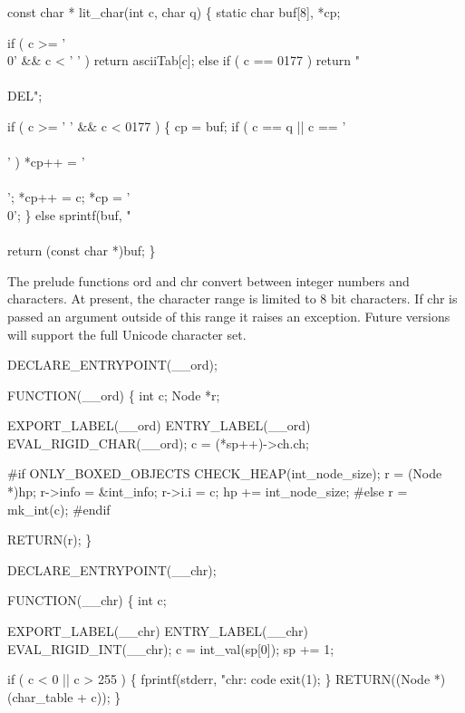 const char *
lit_char(int c, char q)
\{
    static char buf[8], *cp;
    
    if ( c >= '\\0' && c < ' ' )
        return asciiTab[c];
    else if ( c == 0177 )
        return "\\\\DEL";

    if ( c >= ' ' && c < 0177 )
    \{
        cp = buf;
        if ( c == q || c == '\\\\' )
            *cp++ = '\\\\';
        *cp++ = c;
        *cp   = '\\0';
    \}
    else
        sprintf(buf, "\\\\%

    return (const char *)buf;
\}

\nwendcode{}\nwdocspar
The prelude functions {\Tt{}ord\nwendquote} and {\Tt{}chr\nwendquote} convert between integer
numbers and characters. At present, the character range is limited to
8 bit characters. If {\Tt{}chr\nwendquote} is passed an argument outside of this
range it raises an exception. Future versions will support the full
Unicode character set.

\nwenddocs{}\plusendmoddef\nwstartdeflinemarkup{}\nwenddeflinemarkup
DECLARE_ENTRYPOINT(__ord);

FUNCTION(__ord)
\{
    int c;
    Node *r;

    EXPORT_LABEL(__ord)
 ENTRY_LABEL(__ord)
    EVAL_RIGID_CHAR(__ord);
    c   = (*sp++)->ch.ch;

#if ONLY_BOXED_OBJECTS
    CHECK_HEAP(int_node_size);
    r       = (Node *)hp;
    r->info = &int_info;
    r->i.i  = c;
    hp     += int_node_size;
#else
    r = mk_int(c);
#endif

    RETURN(r);
\}


DECLARE_ENTRYPOINT(__chr);

FUNCTION(__chr)
\{
    int c;

    EXPORT_LABEL(__chr)
 ENTRY_LABEL(__chr)
    EVAL_RIGID_INT(__chr);
    c   = int_val(sp[0]);
    sp += 1;

    if ( c < 0 || c > 255 )
    \{
        fprintf(stderr, "chr: code %
        exit(1);
    \}
   RETURN((Node *)(char_table + c));
\}
\nwendcode{}

%
%

